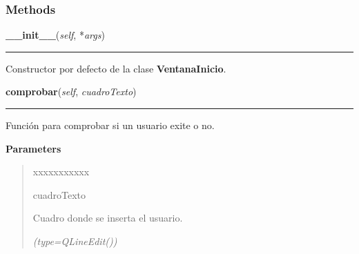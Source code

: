   \subsubsection{Methods}

    \label{inicio:VentanaInicio:__init__}

    \vspace{0.5ex}

\hspace{.8\funcindent}\begin{boxedminipage}{\funcwidth}

    \raggedright \textbf{\_\_init\_\_}(\textit{self}, *\textit{args})

    \vspace{-1.5ex}

    \rule{\textwidth}{0.5\fboxrule}
\setlength{\parskip}{2ex}
    Constructor por defecto de la clase \textbf{VentanaInicio}.

\setlength{\parskip}{1ex}
    \end{boxedminipage}

    \label{inicio:VentanaInicio:comprobar}

    \vspace{0.5ex}

\hspace{.8\funcindent}\begin{boxedminipage}{\funcwidth}

    \raggedright \textbf{comprobar}(\textit{self}, \textit{cuadroTexto})

    \vspace{-1.5ex}

    \rule{\textwidth}{0.5\fboxrule}
\setlength{\parskip}{2ex}
    Función para comprobar si un usuario exite o no.

\setlength{\parskip}{1ex}
      \textbf{Parameters}
      \vspace{-1ex}

      \begin{quote}
        \begin{Ventry}{xxxxxxxxxxx}

          \item[cuadroTexto]

          Cuadro donde se inserta el usuario.

            {\it (type=QLineEdit())}

        \end{Ventry}

      \end{quote}

    \end{boxedminipage}

